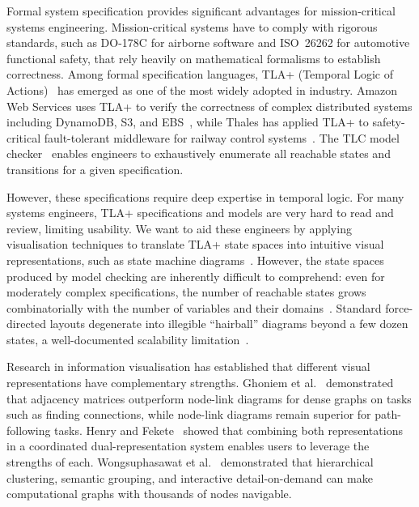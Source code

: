 \documentclass[conference]{IEEEtran}
\begin{document}
Formal system specification provides significant advantages for mission-critical systems engineering. Mission-critical systems have to comply with rigorous standards, such as DO-178C for airborne software and ISO~26262 for automotive functional safety, that rely heavily on mathematical formalisms to establish correctness. Among formal specification languages, TLA+ (Temporal Logic of Actions)~\cite{lamport2003specifying, lamport2009pluscal} has emerged as one of the most widely adopted in industry. Amazon Web Services uses TLA+ to verify the correctness of complex distributed systems including DynamoDB, S3, and EBS~\cite{newcombe2015amazon}, while Thales has applied TLA+ to safety-critical fault-tolerant middleware for railway control systems~\cite{resch2017tla}. The TLC model checker~\cite{yuan1999model} enables engineers to exhaustively enumerate all reachable states and transitions for a given specification.


However, these specifications require deep expertise in temporal logic. For many systems engineers, TLA+ specifications and models are very hard to read and review, limiting usability. We want to aid these engineers by applying visualisation techniques to translate TLA+ state spaces into intuitive visual representations, such as state machine diagrams~\cite{harel1987statecharts, harel1988visual}. However, the state spaces produced by model checking are inherently difficult to comprehend: even for moderately complex specifications, the number of reachable states grows combinatorially with the number of variables and their domains~\cite{liu2005model}. Standard force-directed layouts degenerate into illegible ``hairball'' diagrams beyond a few dozen states, a well-documented scalability limitation~\cite{herman2000graph}.

Research in information visualisation has established that different visual representations have complementary strengths. Ghoniem et al.~\cite{ghoniem2004comparison} demonstrated that adjacency matrices outperform node-link diagrams for dense graphs on tasks such as finding connections, while node-link diagrams remain superior for path-following tasks. Henry and Fekete~\cite{henry2006matrixexplorer} showed that combining both representations in a coordinated dual-representation system enables users to leverage the strengths of each. Wongsuphasawat et al.~\cite{wongsuphasawat2018tensorflow} demonstrated that hierarchical clustering, semantic grouping, and interactive detail-on-demand can make computational graphs with thousands of nodes navigable.
\end{document}
